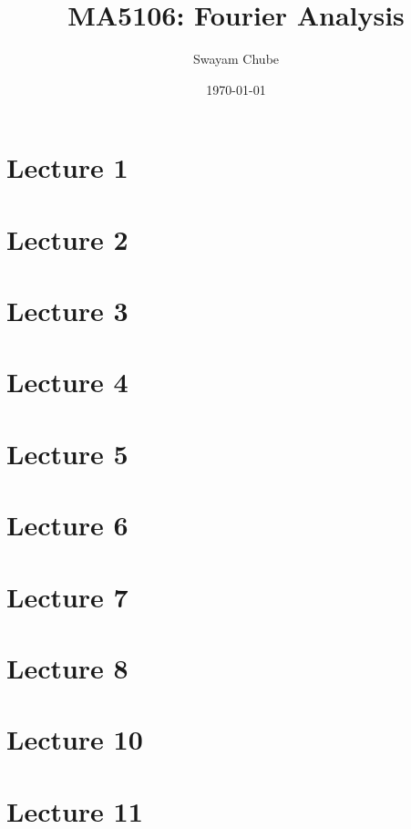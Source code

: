 \documentclass{report}
\title{MA5106: Fourier Analysis}
\author{Swayam Chube}
\date{\today}
\begin{document}
\maketitle

\tableofcontents

\chapter{Lecture 1}


\chapter{Lecture 2}


\chapter{Lecture 3}


\chapter{Lecture 4}


\chapter{Lecture 5}


\chapter{Lecture 6}


\chapter{Lecture 7}


\chapter{Lecture 8}


\chapter{Lecture 10}


\chapter{Lecture 11}

\end{document}
